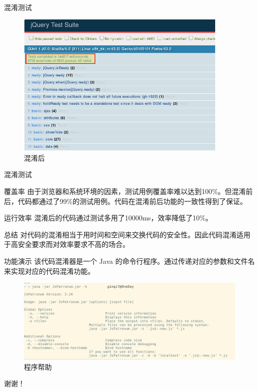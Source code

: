 \documentclass[presentation]{beamer}
\begin{document}
\begin{frame}[label=sec-23]{混淆测试}
\begin{center}
\begin{figure}[htb]
\centering
\includegraphics[width=4in]{./presentation03-02.png}
\caption{混淆后}
\end{figure}
\end{center}
\end{frame}

\begin{frame}[label=sec-24]{混淆测试}
\begin{block}{覆盖率}
由于浏览器和系统环境的因素，测试用例覆盖率难以达到100\%。但混淆前后，代码都通过了99\%的测试用例。代码在混淆前后功能的一致性得到了保证。
\end{block}
\begin{block}{运行效率}
混淆后的代码通过测试多用了10000ms，效率降低了10\%。
\end{block}
\begin{block}{总结}
对代码的混淆相当于用时间和空间来交换代码的安全性。因此代码混淆适用于高安全要求而对效率要求不高的场合。
\end{block}
\end{frame}
\begin{frame}[label=sec-25]{功能演示}
该代码混淆器是一个 Java 的命令行程序。通过传递对应的参数和文件名来实现对应的代码混淆功能。
\begin{center}
\begin{figure}[htb]
\centering
\includegraphics[width=4.5in]{./presentation03-04.png}
\caption{程序帮助}
\end{figure}
\end{center}
\end{frame}
\begin{frame}[label=sec-26]{}
\begin{center}
\Huge{谢谢！}
\end{center}
\end{frame}
\end{document}
